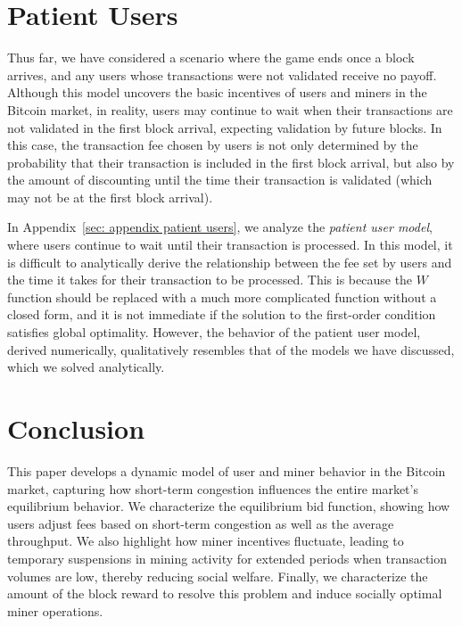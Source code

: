 \documentclass[12pt, letterpaper]{article}
\begin{document}
\section{Patient Users}\label{sec: patient user summary}

Thus far, we have considered a scenario where the game ends once a block arrives, and any users whose transactions were not validated receive no payoff. Although this model uncovers the basic incentives of users and miners in the Bitcoin market, in reality, users may continue to wait when their transactions are not validated in the first block arrival, expecting validation by future blocks. In this case, the transaction fee chosen by users is not only determined by the probability that their transaction is included in the first block arrival, but also by the amount of discounting until the time their transaction is validated (which may not be at the first block arrival).

In Appendix~\ref{sec: appendix patient users}, we analyze the \emph{patient user model}, where users continue to wait until their transaction is processed. In this model, it is difficult to analytically derive the relationship between the fee set by users and the time it takes for their transaction to be processed. This is because the $W$ function should be replaced with a much more complicated function without a closed form, and it is not immediate if the solution to the first-order condition satisfies global optimality. However, the behavior of the patient user model, derived numerically, qualitatively resembles that of the models we have discussed, which we solved analytically. 



\section{Conclusion}\label{sec: conclusion}

This paper develops a dynamic model of user and miner behavior in the Bitcoin market, capturing how short-term congestion influences the entire market's equilibrium behavior. We characterize the equilibrium bid function, showing how users adjust fees based on short-term congestion as well as the average throughput. We also highlight how miner incentives fluctuate, leading to temporary suspensions in mining activity for extended periods when transaction volumes are low, thereby reducing social welfare. Finally, we characterize the amount of the block reward to resolve this problem and induce socially optimal miner operations.
\end{document}
